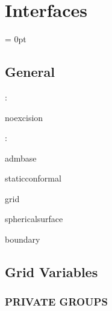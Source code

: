 
\section{Interfaces} 


\parskip = 0pt

\vspace{3mm} \subsection*{General}

: 

noexcision
\vspace{2mm}

: 

admbase

staticconformal

grid

sphericalsurface

boundary
\vspace{2mm}
\subsection*{Grid Variables}
\vspace{5mm}\subsubsection{PRIVATE GROUPS}

\vspace{5mm}

